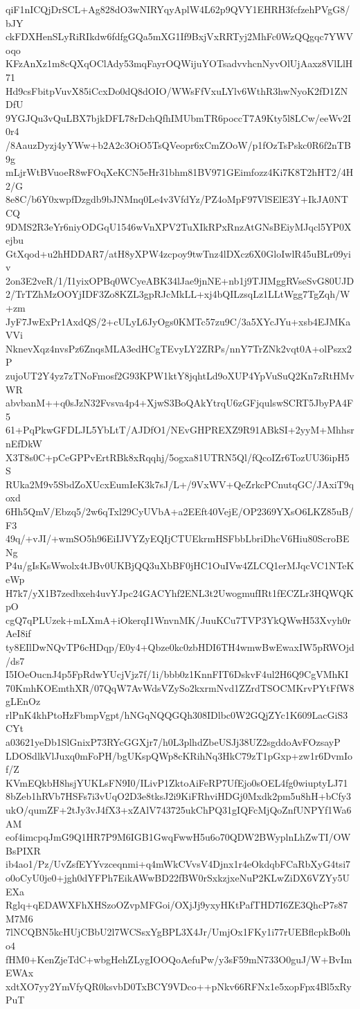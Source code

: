 qiF1nICQjDrSCL+Ag828dO3wNIRYqyAplW4L62p9QVY1EHRH3fcfzehPVgG8/bJY
ckFDXHenSLyRiRIkdw6fdfgGQa5mXG1If9BxjVxRRTyj2MhFc0WzQQgqc7YWVoqo
KFzAnXz1m8cQXqOClAdy53mqFayrOQWijuYOTsadvvhcnNyvOlUjAaxz8VlLlH71
Hd9csFbitpVuvX85iCcxDo0dQ8dOIO/WWsFfVxuLYlv6WthR3hwNyoK2fD1ZNDfU
9YGJQu3vQuLBX7bjkDFL78rDchQfhIMUbmTR6poccT7A9Kty5l8LCw/eeWv2I0r4
/8AauzDyzj4yYWw+b2A2c3OiO5TsQVeopr6xCmZOoW/p1fOzTsPskc0R6f2nTB9g
mLjrWtBVuoeR8wFOqXeKCN5eHr31bhm81BV971GEimfozz4Ki7K8T2hHT2/4H2/G
8e8C/b6Y0xwpfDzgdb9bJNMnq0Le4v3VfdYz/PZ4oMpF97VlSElE3Y+IkJA0NTCQ
9DMS2R3eYr6niyODGqU1546wVnXPV2TuXIkRPxRnzAtGNsBEiyMJqcl5YP0Xejbu
GtXqod+u2hHDDAR7/atH8yXPW4zcpoy9twTnz4lDXcz6X0GloIwlR45uBLr09yiv
2on3E2veR/1/I1yixOPBq0WCyeABK34lJae9jnNE+nb1j9TJIMggRVseSvG80UJD
2/TrTZhMzOOYjIDF3Zo8KZL3gpRJcMkLL+xj4bQILzsqLz1LLtWgg7TgZqh/W+zm
JyF7JwExPr1AxdQS/2+cULyL6JyOgs0KMTc57zu9C/3a5XYcJYu+xsb4EJMKaVVi
NknevXqz4nvsPz6ZnqsMLA3edHCgTEvyLY2ZRPs/nnY7TrZNk2vqt0A+olPszx2P
zujoUT2Y4yz7zTNoFmosf2G93KPW1ktY8jqhtLd9oXUP4YpVuSuQ2Kn7zRtHMvWR
abvbanM++q0sJzN32Fvsva4p4+XjwS3BoQAkYtrqU6zGFjqulswSCRT5JbyPA4F5
61+PqPkwGFDLJL5YbLtT/AJDfO1/NEvGHPREXZ9R91ABkSI+2yyM+MhhsrnEfDkW
X3T8s0C+pCeGPPvErtRBk8xRqqhj/5ogxa81UTRN5Ql/fQcoIZr6TozUU36ipH5S
RUka2M9v5SbdZoXUcxEumIeK3k7sJ/L+/9VxWV+QeZrkcPCnutqGC/JAxiT9qoxd
6Hh5QmV/Ebzq5/2w6qTxl29CyUVbA+a2EEft40VejE/OP2369YXsO6LKZ85uB/F3
49q/+vJI/+wmSO5h96EiIJVYZyEQIjCTUEkrmHSFbbLbriDhcV6Hiu80ScroBENg
P4u/gIsKsWwolx4tJBv0UKBjQQ3uXbBF0jHC1OuIVw4ZLCQ1erMJqcVC1NTeKeWp
H7k7/yX1B7zedbxeh4uvYJpc24GACYhf2ENL3t2UwogmufIRt1fECZLr3HQWQKpO
cgQ7qPLUzek+mLXmA+iOkerqI1WnvnMK/JuuKCu7TVP3YkQWwH53Xvyh0rAeI8if
ty8EIlDwNQvTP6cHDqp/E0y4+Qbze0kc0zbHDI6TH4wmwBwEwaxIW5pRWOjd/ds7
I5IOeOucnJ4p5FpRdwYUcjVjz7f/1i/bbb0z1KnnFIT6DskvF4ul2H6Q9CgVMhKI
70KmhKOEmthXR/07QqW7AvWdsVZySo2kxrmNvd1ZZrdTSOCMKrvPYtFfW8gLEnOz
rlPnK4khPtoHzFbmpVgpt/hNGqNQQGQh308IDlbc0W2GQjZYc1K609LacGiS3CYt
a03621yeDb1SlGnixP73RYcGGXjr7/h0L3plhdZbeUSJj38UZ2sgddoAvFOzsayP
LDOSdlkVlJuxq0mFoPH/bgUKspQWp8cKRihNq3HkC79zT1pGxp+zw1r6DvmIof/Z
KVmEQkbH8hsjYUKLsFN9I0/ILivP1ZktoAiFeRP7UfEjo0sOEL4fg0wiuptyLJ71
8bZeb1hRVb7HSFs7i3vUqO2D3e8tksJ2i9KiFRhviHDGj0Mxdk2pm5u8hH+bCfy3
ukO/qumZF+2tJy3vJ4fX3+xZAlV743725ukChPQ31gIQFcMjQoZnfUNPYf1Wa6AM
eof4imcpqJmG9Q1HR7P9M6IGB1GwqFwwH5u6o70QDW2BWyplnLhZwTI/OWBsPIXR
ib4ao1/Pz/UvZsfEYYvzceqnmi+q4mWkCVvsV4Djnx1r4eOkdqbFCaRbXyG4tsi7
o0oCyU0je0+jgh0dYFPh7EikAWwBD22fBW0rSxkzjxeNuP2KLwZiDX6VZYy5UEXa
Rglq+qEDAWXFhXHSzoOZvpMFGoi/OXjJj9yxyHKtPafTHD7I6ZE3QhcP7s87M7M6
7lNCQBN5kcHUjCBbU2l7WCSsxYgBPL3X4Jr/UmjOx1FKy1i77rUEBflcpkBo0ho4
fHM0+KenZjeTdC+wbgHehZLygIOOQoAefuPw/y3sF59mN733O0guJ/W+BvImEWAx
xdtXO7yy2YmVfyQR0ksvbD0TxBCY9VDco++pNkv66RFNx1e5xopFpx4Bl5xRyPuT
